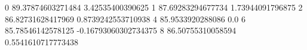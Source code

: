 0 89.37874603271484 3.42535400390625
1 87.69283294677734 1.73944091796875
2 86.82731628417969 0.8739242553710938
4 85.9533920288086 0.0
6 85.78546142578125 -0.16793060302734375
8 86.50755310058594 0.5541610717773438
